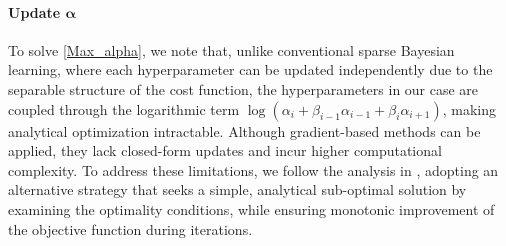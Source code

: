 \documentclass[lettersize,journal]{IEEEtran}
\theoremstyle{remark}
\begin{document}
\paragraph{Update $\boldsymbol{\alpha}$} 

To solve \eqref{Max_alpha}, we note that, unlike conventional  sparse Bayesian learning, where each hyperparameter can be updated independently due to the separable structure of the cost function, the hyperparameters in our case are coupled through the logarithmic term $\log (\alpha_i + \beta_{i-1} \alpha_{i-1} + \beta_i \alpha_{i+1})$, making analytical optimization intractable. Although gradient-based methods can be applied, they lack closed-form updates and incur higher computational complexity. To address these limitations, we follow the analysis in  \cite{fang2014pattern}, adopting an alternative strategy that seeks a simple, analytical sub-optimal solution by examining the optimality conditions, while ensuring monotonic improvement of the objective function during iterations. 
\end{document}
